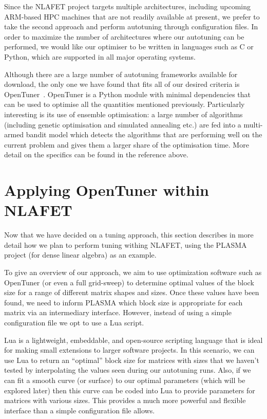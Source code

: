 \documentclass[a4paper,12pt]{article}
\begin{document}
Since the NLAFET project targets multiple architectures,
including upcoming ARM-based HPC machines that are not readily
available at present,
we prefer to take the second approach and perform autotuning
through configuration files.
In order to maximize the number of architectures where our
autotuning can be performed,
we would like our optimiser to be written in languages such as
C or Python, which are supported in all major operating systems.

Although there are a large number of autotuning frameworks
available for download,
the only one we have found that fits all of our desired
criteria is OpenTuner~\cite{ansel:pact:2014}.
OpenTuner is a Python module with minimal dependencies that
can be used to optimise all the quantities mentioned previously.
Particularly interesting is its use of ensemble optimisation:
a large number of algorithms
(including genetic optimisation and simulated annealing etc.)
are fed into a multi-armed bandit model
which detects the algorithms that are performing well on the current
problem and gives them a larger share of the optimisation time.
More detail on the specifics can be found in the reference above.

\section{Applying OpenTuner within NLAFET}
\label{sec:opentuner}
Now that we have decided on a tuning approach,
this section describes in more detail how we plan to
perform tuning withing NLAFET,
using the PLASMA project (for dense linear algebra)
as an example.

To give an overview of our approach,
we aim to use optimization software such as OpenTuner
(or even a full grid-sweep)
to determine optimal values of the block size for
a range of different matrix shapes and sizes.
Once these values have been found,
we need to inform PLASMA which block size is appropriate for
each matrix via an intermediary interface.
However,
instead of using a simple configuration file
we opt to use a Lua script.

Lua is a lightweight, embeddable, and open-source scripting language
that is ideal for making small extensions to larger software projects.
In this scenario,
we can use Lua to return an ``optimal'' block size for matrices with
sizes that we haven't tested by interpolating the values seen
during our autotuning runs.
Also,
if we can fit a smooth curve (or surface) to our optimal parameters
(which will be explored later)
then this curve can be coded into Lua to
provide parameters for matrices with various sizes.
This provides a much more powerful and flexible interface
than a simple configuration file allows.
\end{document}
